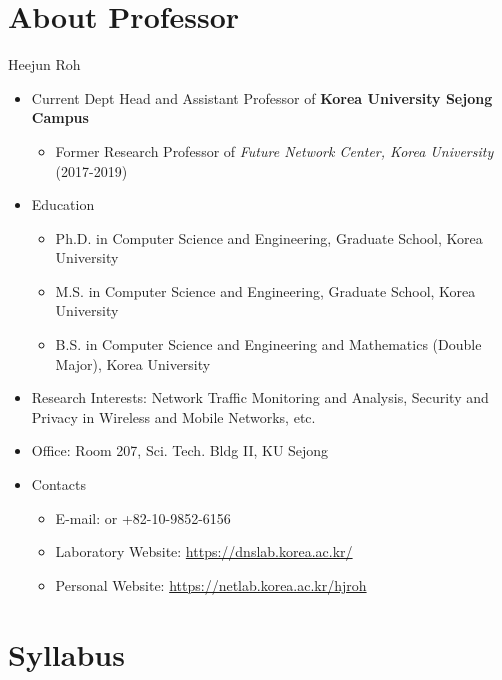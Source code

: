 \titleframe


\section*{About Professor}

\begin{frame}{Heejun Roh}
  \begin{itemize}
  \item Current Dept Head and Assistant Professor of {\bf Korea University Sejong Campus}
    \begin{itemize}
      \item Former Research Professor of {\em Future Network Center, Korea University} (2017-2019)
    \end{itemize}
  \item Education
  \begin{itemize}
    \item Ph.D. in Computer Science and Engineering, Graduate School, Korea University
    \item M.S. in Computer Science and Engineering, Graduate School, Korea University
    \item B.S. in Computer Science and Engineering and Mathematics (Double Major), Korea University
  \end{itemize}  
  \item Research Interests: Network Traffic Monitoring and Analysis, Security and Privacy in Wireless and Mobile Networks, etc.
  \item Office: Room 207, Sci. Tech. Bldg II, KU Sejong
  \item Contacts
    \begin{itemize}
      \item E-mail:  or +82-10-9852-6156
      \item Laboratory Website: \url{https://dnslab.korea.ac.kr/}
      \item Personal Website: \url{https://netlab.korea.ac.kr/hjroh}
    \end{itemize}
  \end{itemize}
\end{frame}

\section*{Syllabus}

